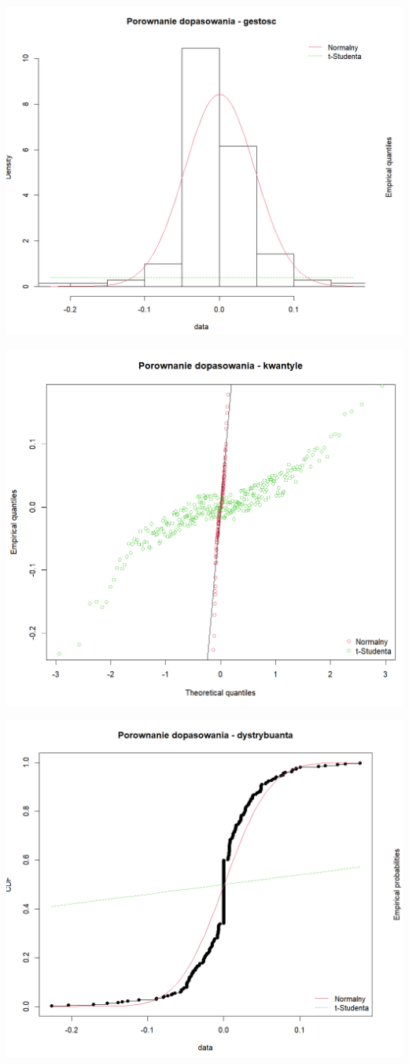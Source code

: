 \documentclass[a4paper,11pt]{article}
\begin{document}
\centerline{\includegraphics[width=14cm]{./Janek/dopasowanie gestosc.png}}
\centerline{\includegraphics[width=14cm]{./Janek/dopasowanie kwantyle.png}} 
\centerline{\includegraphics[width=14cm]{./Janek/dopasowanie dystrybuanta.png}}
\end{document}
